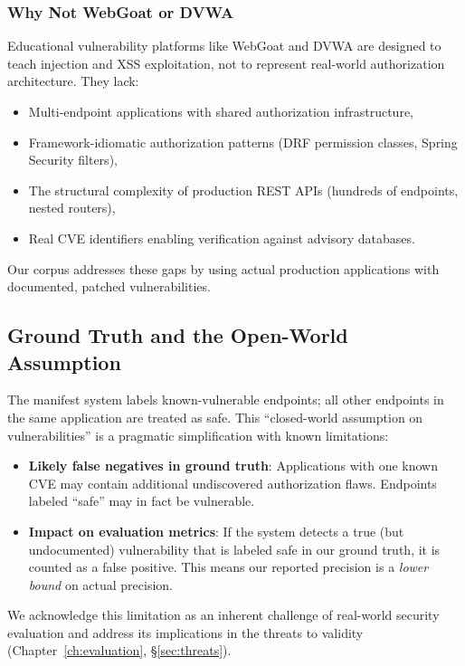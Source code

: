 \subsubsection{Why Not WebGoat or DVWA}

Educational vulnerability platforms like WebGoat and DVWA are designed to teach injection and XSS exploitation, not to represent real-world authorization architecture. They lack:
\begin{itemize}
    \item Multi-endpoint applications with shared authorization infrastructure,
    \item Framework-idiomatic authorization patterns (DRF permission classes, Spring Security filters),
    \item The structural complexity of production REST APIs (hundreds of endpoints, nested routers),
    \item Real CVE identifiers enabling verification against advisory databases.
\end{itemize}

Our corpus addresses these gaps by using actual production applications with documented, patched vulnerabilities.

\subsection{Ground Truth and the Open-World Assumption}

The manifest system labels known-vulnerable endpoints; all other endpoints in the same application are treated as safe. This ``closed-world assumption on vulnerabilities'' is a pragmatic simplification with known limitations:

\begin{itemize}
    \item \textbf{Likely false negatives in ground truth}: Applications with one known CVE may contain additional undiscovered authorization flaws. Endpoints labeled ``safe'' may in fact be vulnerable.
    \item \textbf{Impact on evaluation metrics}: If the system detects a true (but undocumented) vulnerability that is labeled safe in our ground truth, it is counted as a false positive. This means our reported precision is a \emph{lower bound} on actual precision.
\end{itemize}

We acknowledge this limitation as an inherent challenge of real-world security evaluation and address its implications in the threats to validity (Chapter~\ref{ch:evaluation}, \S\ref{sec:threats}).

